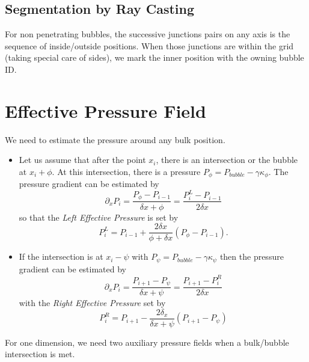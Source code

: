 \documentclass[aps]{revtex4}
\begin{document}
\subsection{Segmentation by Ray Casting}
For non penetrating bubbles, the successive junctions pairs on any axis is the sequence of inside/outside positions.
When those junctions are within the grid (taking special care of sides), we mark the inner position with the owning bubble ID.

\section{Effective Pressure Field}
We need to estimate the pressure around any bulk position.
\begin{itemize}
\item
Let us assume that after the point $x_i$, there is an intersection or the bubble at $x_i + \phi$.
At this intersection, there is a pressure $P_\phi = P_{bubble} - \gamma \kappa_\phi$.
The pressure gradient can be estimated by
$$
	\partial_x P_i = \dfrac{P_\phi - P_{i-1}}{\delta x + \phi} = \dfrac{P_i^L - P_{i-1}}{2\delta x}
$$
so that the \textit{Left Effective Pressure} is set by
$$
	P_i^L = P_{i-1} + \dfrac{2\delta x}{\phi+\delta x} \left( P_\phi - P_{i-1} \right).
$$
\item
If the intersection is at $x_i-\psi$ with $P_\psi = P_{bubble} - \gamma \kappa_\psi$
then the pressure gradient can be estimated by
$$
	\partial_x P_i = \dfrac{P_{i+1} - P_\psi}{\delta x + \psi} = \dfrac{P_{i+1}-P_i^R}{2\delta x}
$$
with the \textit{Right Effective Pressure} set by
$$
	P_i^R = P_{i+1} - \dfrac{2\delta_x}{\delta x + \psi}\left(P_{i+1} - P_\psi\right)
$$
\end{itemize}
For one dimension, we need two auxiliary pressure fields when a bulk/bubble intersection is met.
\end{document}
